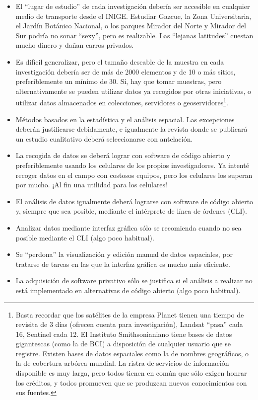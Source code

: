 \documentclass[12pt,letterpaper,spanish]{article}
\newcommand{\entacron}{INIGE}
\begin{document}
\begin{itemize}
\item El ``lugar de estudio'' de cada investigación debería ser accesible en cualquier medio de transporte desde el \entacron{}. Estudiar Gazcue, la Zona Universitaria, el Jardín Botánico Nacional, o los parques Mirador del Norte y Mirador del Sur podría no sonar ``sexy'', pero es realizable. Las ``lejanas latitudes'' cuestan mucho dinero y dañan carros privados.
\item Es difícil generalizar, pero el tamaño deseable de la muestra en cada investigación debería ser de más de 2000 elementos y de 10 o más sitios, preferiblemente un mínimo de 30. Sí, hay que tomar muestras, pero alternativamente se pueden utilizar datos ya recogidos por otras iniciativas, o utilizar datos almacenados en colecciones, servidores o geoservidores\footnote{Basta recordar que los satélites de la empresa Planet\cite{planet2018planetexplorer} tienen una tiempo de revisita de 3 días (ofrecen cuenta para investigación), Landsat\cite{nasa2013land} ``pasa'' cada 16, Sentinel\cite{scihub2018copernicus} cada 12. El Instituto Smithsonianiano tiene bases de datos gigantescas (como la de BCI) a disposición de cualquier usuario que se registre. Existen bases de datos espaciales como la de nombres geográficos\cite{geonames2018ngia}, o la de cobertura arbórea mundial\cite{hansen2015global}. La ristra de servicios de información disponible es muy larga, pero todos tienen en común que sólo exigen honrar los créditos, y todos promueven que se produzcan nuevos conocimientos con sus fuentes.}.
\item Métodos basados en la estadística y el análisis espacial. Las excepciones deberán justificarse debidamente, e igualmente la revista donde se publicará un estudio cualitativo deberá seleccionarse con antelación.
\item La recogida de datos se deberá lograr con software de código abierto y preferiblemente usando los celulares de los propios investigadores. Ya intenté recoger datos en el campo con costosos equipos, pero los celulares los superan por mucho. ¡Al fin una utilidad para los celulares!
\item El análisis de datos igualmente deberá lograrse con software de código abierto y, siempre que sea posible, mediante el intérprete de línea de órdenes (CLI).
\item Analizar datos mediante interfaz gráfica sólo se recomienda cuando no sea posible mediante el CLI (algo poco habitual).
\item Se ``perdona'' la visualización y edición manual de datos espaciales, por tratarse de tareas en las que la interfaz gráfica es mucho más eficiente.
\item La adquisición de software privativo sólo se justifica si el análisis a realizar no está implementado en alternativas de código abierto (algo poco habitual).
\end{itemize}
\end{document}
